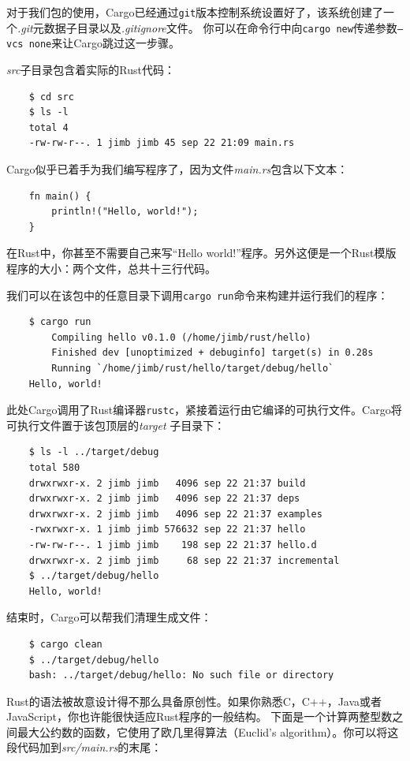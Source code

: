 \medskip
对于我们包的使用，Cargo已经通过\texttt{git}版本控制系统设置好了，该系统创建了一个\textit{.git}元数据子目录以及\textit{.gitignore}文件。
你可以在命令行中向\texttt{cargo new}传递参数\texttt{--vcs none}来让Cargo跳过这一步骤。

\medskip
\textit{src}子目录包含着实际的Rust代码：
\begin{verbatim}
    $ cd src
    $ ls -l
    total 4
    -rw-rw-r--. 1 jimb jimb 45 sep 22 21:09 main.rs
\end{verbatim}

\smallskip
Cargo似乎已着手为我们编写程序了，因为文件\textit{main.rs}包含以下文本：
\begin{verbatim}
    fn main() {
        println!("Hello, world!");
    }
\end{verbatim}

\smallskip
在Rust中，你甚至不需要自己来写``Hello world!''程序。另外这便是一个Rust模版程序的大小：两个文件，总共十三行代码。

\medskip
我们可以在该包中的任意目录下调用\texttt{cargo run}命令来构建并运行我们的程序：
\begin{verbatim}
    $ cargo run
        Compiling hello v0.1.0 (/home/jimb/rust/hello)
        Finished dev [unoptimized + debuginfo] target(s) in 0.28s
        Running `/home/jimb/rust/hello/target/debug/hello`
    Hello, world!
\end{verbatim}

\smallskip
此处Cargo调用了Rust编译器\texttt{rustc}，紧接着运行由它编译的可执行文件。Cargo将可执行文件置于该包顶层的\textit{target}
子目录下：
\begin{verbatim}
    $ ls -l ../target/debug
    total 580
    drwxrwxr-x. 2 jimb jimb   4096 sep 22 21:37 build
    drwxrwxr-x. 2 jimb jimb   4096 sep 22 21:37 deps
    drwxrwxr-x. 2 jimb jimb   4096 sep 22 21:37 examples
    -rwxrwxr-x. 1 jimb jimb 576632 sep 22 21:37 hello
    -rw-rw-r--. 1 jimb jimb    198 sep 22 21:37 hello.d
    drwxrwxr-x. 2 jimb jimb     68 sep 22 21:37 incremental
    $ ../target/debug/hello
    Hello, world!
\end{verbatim}

\smallskip
结束时，Cargo可以帮我们清理生成文件：
\begin{verbatim}
    $ cargo clean
    $ ../target/debug/hello
    bash: ../target/debug/hello: No such file or directory
\end{verbatim}

\bigskip
{}
Rust的语法被故意设计得不那么具备原创性。如果你熟悉C，C++，Java或者JavaScript，你也许能很快适应Rust程序的一般结构。
下面是一个计算两整型数之间最大公约数的函数，它使用了欧几里得算法（Euclid's algorithm）。你可以将这段代码加到\textit{src/main.rs}的末尾：


